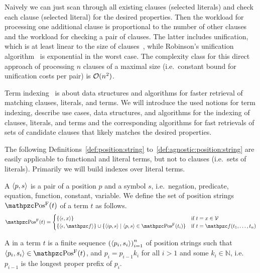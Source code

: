 Naively we can just scan through all existing clauses (selected literals)
and check each clause (selected literal) for the desired properties.
	Then the workload for processing one additional clause is proportional to the number of other clauses and
	the workload for checking a pair of clauses.
	The latter includes unification, which is at least linear to the size of clauses~\cite{ALBERT19933},
	while Robinson's unification algorithm~\cite{Robinson:1965:MLB:321250.321253} is exponential in the worst case.
	The complexity class for this direct approach of processing \( n \) clauses of a maximal size
	(i.e.\ constant bound for unification costs per pair) is \( \mathcal{O}(n^2) \).

	Term indexing~\cite{Graf1998} is about data structures and algorithms
	for faster retrieval of matching clauses, literals, and terms.
	We will introduce the used notions for term indexing, describe
	use cases, data structures, and algorithms for the indexing
	of clauses, literals, and terms and the corresponding algorithms
	for fast retrievals of sets of candidate clauses that likely matches the desired properties.

	\begin{remark}
		The following Definitions~\ref{def:position:string} to~\ref{def:agnostic:position:string}
		are easily applicable to functional and literal terms, but not to clauses (i.e.\ sets of literals).
		Primarily we will build indexes over literal terms.
	\end{remark}

	\begin{definition}\label{def:position:string}
		A  \( \langle p, s \rangle \)
		is a pair of a position \( p \) and a symbol \( s \),
		i.e.~negation, predicate, equation, function, constant, variable.
%
		We define the set of position strings \(\PosStr(t)\)
		of a term \( t \) as follows.
		\begin{gather*}
		\PosStr(t) =
		\begin{cases}
		\{ \ANGLES{\epsilon,x} \}
		& \text{if }t=x\in\SIGV \\
		\{ \ANGLES{\epsilon, \mcf} \} \cup \{ \ANGLES{ip,s}\mid \ANGLES{p,s} \in\PosStr(t_i)\}
		&\text{if }t=\mcf(t_1,\ldots,t_n)
		\end{cases}
		\end{gather*}
	\end{definition}



	\begin{definition}\label{def:term:path}
		A  in a term \( t \)
		is a finite sequence
		\( {( \langle p_i,s_i\rangle )}^{n}_{i=1}
			\)
		of position strings such that
		\( \ANGLES{p_i,s_i} \in \PosStr(t) \),
		and \( p_i = p_{i-1} k_i \)
		for all \( i > 1 \)
		and some \( k_i \in\mathbb{N} \),
		i.e.~\(p_{i-1}\) is the longest proper prefix of \(p_{i}\).


	\end{definition}


